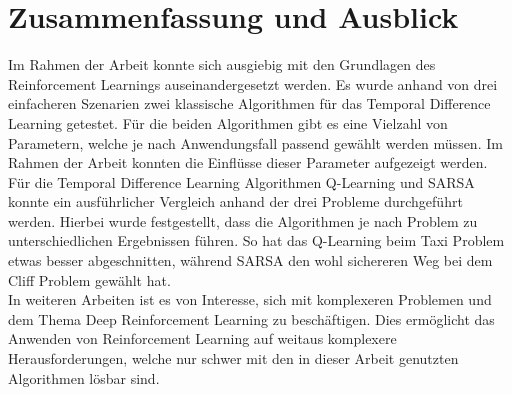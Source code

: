 \section{Zusammenfassung und Ausblick}

Im Rahmen der Arbeit konnte sich ausgiebig mit den Grundlagen des Reinforcement Learnings auseinandergesetzt werden. Es wurde anhand von drei einfacheren Szenarien zwei klassische Algorithmen für das Temporal Difference Learning getestet.
Für die beiden Algorithmen gibt es eine Vielzahl von Parametern, welche je nach Anwendungsfall passend gewählt werden müssen. Im Rahmen der Arbeit konnten die Einflüsse dieser Parameter aufgezeigt werden. Für die Temporal Difference Learning Algorithmen Q-Learning und SARSA konnte ein ausführlicher Vergleich anhand der drei Probleme durchgeführt werden.
Hierbei wurde festgestellt, dass die Algorithmen je nach Problem zu unterschiedlichen Ergebnissen führen. So hat das Q-Learning beim Taxi Problem etwas besser abgeschnitten, während SARSA den wohl sichereren Weg bei dem Cliff Problem gewählt hat. \\

In weiteren  Arbeiten ist es von Interesse, sich mit komplexeren Problemen und dem Thema Deep Reinforcement Learning zu beschäftigen. Dies ermöglicht das Anwenden von Reinforcement Learning auf weitaus komplexere Herausforderungen, welche nur schwer mit den in dieser Arbeit genutzten Algorithmen lösbar sind.